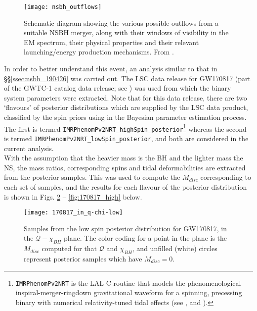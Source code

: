         \begin{figure}[H]
            \centering
            \texttt{[image: nsbh\_outflows]}
            \caption[EM outflows from NSBH mergers, from \cite{barbieri_2019a}]
            {
                Schematic diagram showing the various possible outflows from a suitable
                NSBH merger, along with their windows of visibility in the EM spectrum,
                their physical properties and their relevant launching/energy production
                mechanisms. From \cite{barbieri_2019a}.
            }
            \label{fig:nsbh_outflows}
        \end{figure}

        In order to better understand this event, an analysis similar to that in
        \S\S\ref{ssec:nsbh_190426} was carried out. The LSC data release for GW170817
        (part of the GWTC-1 catalog data release; see \cite{gwtc1_DR}) was used from
        which the binary system parameters were extracted. Note that for this data
        release, there are two `flavours' of posterior distributions which are supplied
        by the LSC data product, classified by the spin priors using in the Bayesian
        parameter estimation process.  The first is termed
        \texttt{IMRPhenomPv2NRT\_highSpin\_posterior}\footnote
        {
            \texttt{IMRPhenomPv2NRT} is the LAL C routine that models the
            phenomenological inspiral-merger-ringdown gravitational waveform for a
            spinning, precessing binary with numerical relativity-tuned tidal effects
            (see \cite{lalsuite}, and \cite{dietrich_2019}).
        }
        whereas the second is termed \texttt{IMRPhenomPv2NRT\_lowSpin\_posterior}, and
        both are considered in the current analysis.\\
        With the assumption that the heavier mass is the BH and the lighter mass the
        NS, the mass ratios, corresponding spins and tidal deformabilities are extracted
        from the posterior samples.  This was used to compute the $M_{disc}$
        corresponding to each set of samples, and the results for each flavour of
        the posterior distribution is shown in Figs. \ref{fig:170817_low} --
        \ref{fig:170817_high} below.

        \begin{figure}[ht]
            \centering
            \texttt{[image: 170817\_in\_q-chi-low]}
            \caption[$M_{disc}$ for GW170817's Low Spin Posterior Distribution]
            {
                Samples from the low spin posterior distribution for GW170817, in the
                $\mathcal{Q}-\chi_{BH}$ plane. The color coding for a point in the plane
                is the $M_{disc}$ computed for that $\mathcal{Q}$ and $\chi_{BH}$, and
                unfilled (white) circles represent posterior samples which have
                $M_{disc} = 0$.
            }
            \label{fig:170817_low}
        \end{figure}

